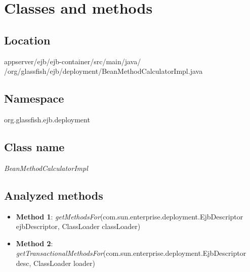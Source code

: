 \section{Classes and methods}
\subsection{Location}
appserver/ejb/ejb-container/src/main/java/\\/org/glassfish/ejb/deployment/BeanMethodCalculatorImpl.java
\subsection{Namespace}
org.glassfish.ejb.deployment
\subsection{Class name}
\textit{BeanMethodCalculatorImpl}
\subsection{Analyzed methods}
\begin{itemize}
	\item \textbf{Method 1}: \textit{getMethodsFor}(com.sun.enterprise.deployment.EjbDescriptor ejbDescriptor, ClassLoader classLoader)
	\item \textbf{Method 2}:  \textit{getTransactionalMethodsFor}(com.sun.enterprise.deployment.EjbDescriptor desc, ClassLoader loader)
\end{itemize}

